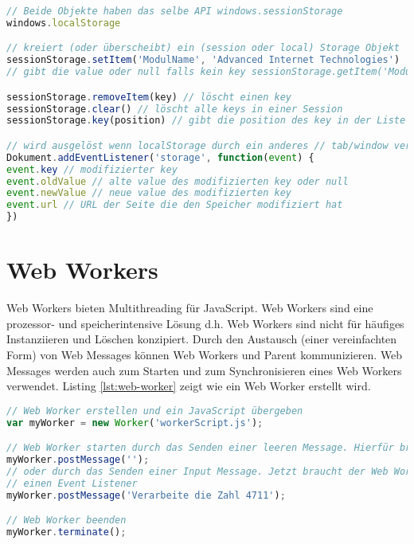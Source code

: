 \begin{lstlisting}[language=Javascript, caption=Web Storage, label=lst:web-storage]
// Beide Objekte haben das selbe API windows.sessionStorage 
windows.localStorage

// kreiert (oder überscheibt) ein (session oder local) Storage Objekt
sessionStorage.setItem('ModulName', 'Advanced Internet Technologies')
// gibt die value oder null falls kein key sessionStorage.getItem('ModulName')

sessionStorage.removeItem(key) // löscht einen key
sessionStorage.clear() // löscht alle keys in einer Session
sessionStorage.key(position) // gibt die position des key in der Liste

// wird ausgelöst wenn localStorage durch ein anderes // tab/window verändert wurde. Der name des events ist 'storage' 
Dokument.addEventListener('storage', function(event) {
event.key // modifizierter key
event.oldValue // alte value des modifizierten key oder null
event.newValue // neue value des modifizierten key
event.url // URL der Seite die den Speicher modifiziert hat
})
\end{lstlisting}

\section{Web Workers}

Web Workers bieten Multithreading für JavaScript. Web Workers sind eine prozessor- und speicherintensive Lösung
d.h. Web Workers sind nicht für häufiges Instanziieren und Löschen konzipiert. Durch den Austausch (einer vereinfachten Form) von Web Messages können Web Workers und Parent kommunizieren. Web Messages werden auch zum Starten und zum Synchronisieren eines Web Workers verwendet. Listing \ref{lst:web-worker} zeigt wie ein Web Worker erstellt wird.

\begin{lstlisting}[language=Javascript, caption=Web Worker, label=lst:web-worker]
// Web Worker erstellen und ein JavaScript übergeben 
var myWorker = new Worker('workerScript.js');

// Web Worker starten durch das Senden einer leeren Message. Hierfür braucht der Web Worker keinen Event Listener 
myWorker.postMessage('');
// oder durch das Senden einer Input Message. Jetzt braucht der Web Worker 
// einen Event Listener
myWorker.postMessage('Verarbeite die Zahl 4711');

// Web Worker beenden
myWorker.terminate();
\end{lstlisting}